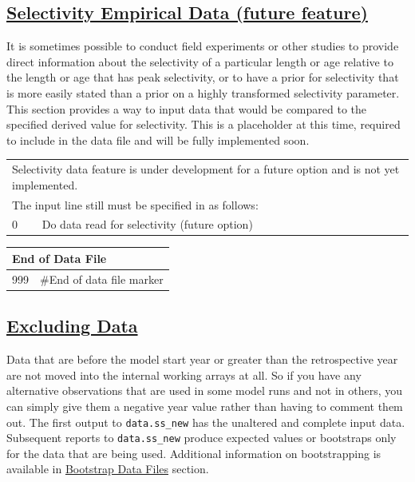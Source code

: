 \hypertarget{SelexEmperical}{}
\subsection[Selectivity Empirical Data (future feature)]{\protect\hyperlink{SelexEmperical}{Selectivity Empirical Data (future feature)}}
It is sometimes possible to conduct field experiments or other studies to provide direct information about the selectivity of a particular length or age relative to the length or age that has peak selectivity, or to have a prior for selectivity that is more easily stated than a prior on a highly transformed selectivity parameter. This section provides a way to input data that would be compared to the specified derived value for selectivity. This is a placeholder at this time, required to include in the data file and will be fully implemented soon.

\begin{center}
	\begin{tabular}{p{1cm} p{1.5cm} p{1.5cm} p{1.5cm} p{1.5cm} p{1.5cm} p{2.5cm} p{2.5cm} p{2.5cm}}
		\multicolumn{9}{l}{Selectivity data feature is under development for a future option and is not yet implemented.} \\
		\multicolumn{9}{l}{The input line still must be specified in as follows:} \\
		\hline
		0 & \multicolumn{8}{l}{Do data read for selectivity (future option)} \Tstrut\Bstrut\\
        \hline
	\end{tabular}
\end{center}

\begin{center}
	\begin{tabular}{p{2cm} p{14cm}} \\
		\multicolumn{2}{l}{End of Data File} \\
		\hline
		999 & \#End of data file marker \Tstrut\Bstrut\\
		\hline
	\end{tabular}
\end{center}

\hypertarget{ExcludingData}{}
\subsection[Excluding Data]{\protect\hyperlink{ExcludingData}{Excluding Data}}
Data that are before the model start year or greater than the retrospective year are not moved into the internal working arrays at all. So if you have any alternative observations that are used in some model runs and not in others, you can simply give them a negative year value rather than having to comment them out. The first output to \texttt{data.ss\_new} has the unaltered and complete input data. Subsequent reports to \texttt{data.ss\_new} produce expected values or bootstraps only for the data that are being used. Additional information on bootstrapping is available in \hyperlink{bootstrap}{Bootstrap Data Files} section. 

